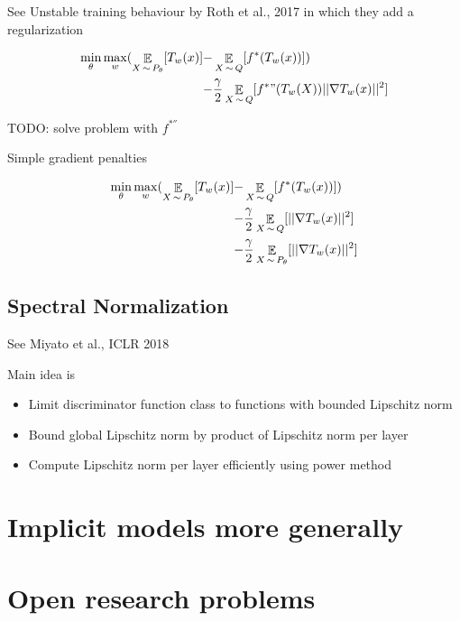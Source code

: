 \documentclass[b5paper]{report}
\begin{document}
See Unstable training behaviour by Roth et al., 2017 in which they add a
regularization

\begin{align}
  \min_\theta \max_w ( \operatorname*{\mathbb{\mathop{E}}}_{X\operatorname*{\sim} P_\theta}[T_w(x)]
    -& \operatorname*{\mathbb{\mathop{E}}}_{X\operatorname*{\sim} Q}[f^*(T_w(x))]) \\
  -& \frac{\gamma}{2} \operatorname*{\mathbb{\mathop{E}}}_{X\operatorname*{\sim} Q}[ f^*"(T_w(X)) || \nabla T_w(x)||^2]
\end{align}

TODO: solve problem with $f^{*''}$

Simple gradient penalties

\begin{align}
  \min_\theta \max_w ( \operatorname*{\mathbb{\mathop{E}}}_{X\operatorname*{\sim} P_\theta}[T_w(x)]
    -& \operatorname*{\mathbb{\mathop{E}}}_{X\operatorname*{\sim} Q}[f^*(T_w(x))])  \\
    -& \frac{\gamma}{2} \operatorname*{\mathbb{\mathop{E}}}_{X\operatorname*{\sim} Q}[|| \nabla T_w(x)||^2] \\
    -& \frac{\gamma}{2} \operatorname*{\mathbb{\mathop{E}}}_{X\operatorname*{\sim} P_\theta}[|| \nabla T_w(x)||^2]
\end{align}

\subsection{Spectral Normalization}

See Miyato et al., ICLR 2018 \cite{miyato2018spectral}

Main idea is

\begin{itemize}
  \item Limit discriminator function class to functions with bounded Lipschitz
    norm
  \item Bound global Lipschitz norm by product of Lipschitz norm per layer
  \item Compute Lipschitz norm per layer efficiently using power method
\end{itemize}

\section{Implicit models more generally}
\section{Open research problems}
\end{document}
